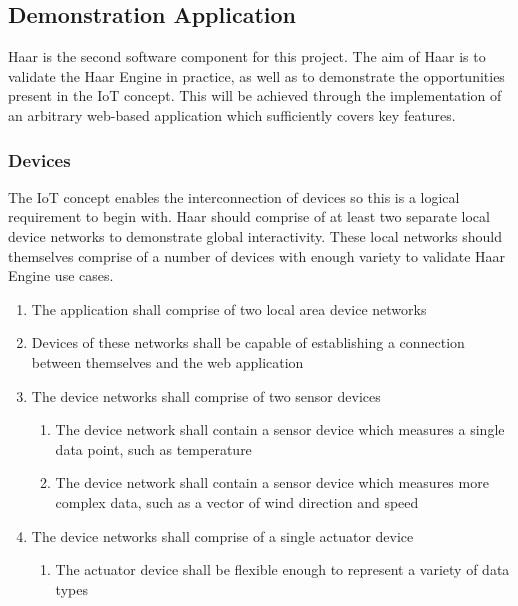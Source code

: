     \subsection{Demonstration Application}
    \label{section:demonstration-application-spec}
      Haar is the second software component for this project. The aim of Haar is to validate the Haar Engine in practice, as well as to demonstrate the opportunities present in the IoT concept. This will be achieved through the implementation of an arbitrary web-based application which sufficiently covers key features.

      \subsubsection{Devices}
        The IoT concept enables the interconnection of devices so this is a logical requirement to begin with. Haar should comprise of at least two separate local device networks to demonstrate global interactivity. These local networks should themselves comprise of a number of devices with enough variety to validate Haar Engine use cases.

        \begin{enumerate}
          \item The application shall comprise of two local area device networks
          \item Devices of these networks shall be capable of establishing a connection between themselves and the web application
          \item The device networks shall comprise of two sensor devices
          \begin{enumerate}
            \item The device network shall contain a sensor device which measures a single data point, such as temperature
            \item The device network shall contain a sensor device which measures more complex data, such as a vector of wind direction and speed 
          \end{enumerate}
          \item The device networks shall comprise of a single actuator device
          \begin{enumerate}
            \item The actuator device shall be flexible enough to represent a variety of data types
          \end{enumerate} 
        \end{enumerate}

